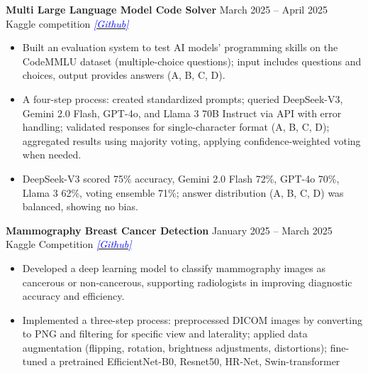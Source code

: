 \documentclass[11pt]{article}
\begin{document}
    \textbf{Multi Large Language Model Code Solver} 
    \hfill March 2025 – April 2025 \\ 
    Kaggle competition 
    \hfill 
    \href{https://github.com/taitruong256/CodeMMLU}{\textcolor{blue}{\textit{[Github]}}}
    
    \begin{itemize}[noitemsep, topsep=0pt, partopsep=0pt, parsep=0pt]
        \item Built an evaluation system to test AI models' programming skills on the CodeMMLU dataset (multiple-choice questions); input includes questions and choices, output provides answers (A, B, C, D).
        \item A four-step process: created standardized prompts; queried DeepSeek-V3, Gemini 2.0 Flash, GPT-4o, and Llama 3 70B Instruct via API with error handling; validated responses for single-character format (A, B, C, D); aggregated results using majority voting, applying confidence-weighted voting when needed.
        \item DeepSeek-V3 scored 75\% accuracy, Gemini 2.0 Flash 72\%, GPT-4o 70\%, Llama 3 62\%, voting ensemble 71\%; answer distribution (A, B, C, D) was balanced, showing no bias.
    \end{itemize}
    
    \vspace{12pt}

    \textbf{Mammography Breast Cancer Detection} 
    \hfill January 2025 -- March 2025 \\
    Kaggle Competition
    \hfill 
    \href{https://github.com/taitruong256/BreastCancer}{\textcolor{blue}{\textit{[Github]}}}
    
    \begin{itemize}[noitemsep, topsep=0pt, partopsep=0pt, parsep=0pt]
        \item Developed a deep learning model to classify mammography images as cancerous or non-cancerous, supporting radiologists in improving diagnostic accuracy and efficiency.
        \item Implemented a three-step process: preprocessed DICOM images by converting to PNG and filtering for specific view and laterality; applied data augmentation (flipping, rotation, brightness adjustments, distortions); fine-tuned a pretrained EfficientNet-B0, Resnet50, HR-Net, Swin-transformer 
    \end{itemize}
    
    
    \vspace{12pt}
    
\end{document}
